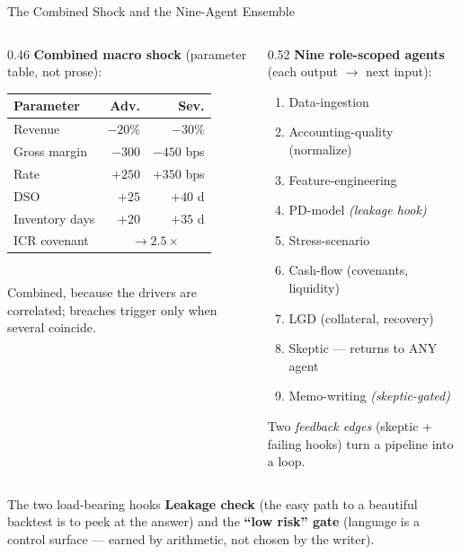 \documentclass[9pt,t]{beamer}
\begin{document}
\begin{frame}{The Combined Shock and the Nine-Agent Ensemble}

\begin{columns}[T]
\begin{column}{0.46\textwidth}
\textbf{Combined macro shock} (parameter table, not prose):
\smallskip
\begin{tabular}{@{}lrr@{}}
\toprule
Parameter & Adv. & Sev. \\
\midrule
Revenue & $-20\%$ & $-30\%$ \\
Gross margin & $-300$ & $-450$ bps \\
Rate & $+250$ & $+350$ bps \\
DSO & $+25$ & $+40$ d \\
Inventory days & $+20$ & $+35$ d \\
ICR covenant & \multicolumn{2}{c}{$\to 2.5\times$} \\
\bottomrule
\end{tabular}
\smallskip\\
\alert{Combined}, because the drivers are correlated; breaches trigger only when
several coincide.
\end{column}
\begin{column}{0.52\textwidth}
\textbf{Nine role-scoped agents} (each output $\to$ next input):
\smallskip
\begin{enumerate}\footnotesize
  \item Data-ingestion
  \item Accounting-quality (normalize)
  \item Feature-engineering
  \item PD-model \hfill\textit{(leakage hook)}
  \item Stress-scenario
  \item Cash-flow (covenants, liquidity)
  \item LGD (collateral, recovery)
  \item \alert{Skeptic} --- returns to ANY agent
  \item Memo-writing \hfill\textit{(skeptic-gated)}
\end{enumerate}
\smallskip
Two \emph{feedback edges} (skeptic + failing hooks) turn a pipeline into a loop.
\end{column}
\end{columns}

\medskip
\begin{block}{The two load-bearing hooks}
\textbf{Leakage check} (the easy path to a beautiful backtest is to peek at the
answer) and the \textbf{``low risk'' gate} (language is a control surface ---
earned by arithmetic, not chosen by the writer).
\end{block}
\end{frame}
\end{document}
